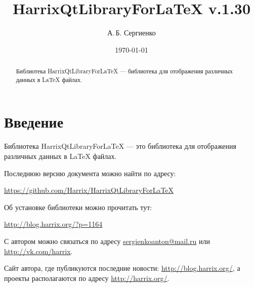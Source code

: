 \documentclass[a4paper,12pt]{article}
\title{HarrixQtLibraryForLaTeX v.1.30}
\author{А.\,Б. Сергиенко}
\date{\today}
\begin{document}


\maketitle

\begin{abstract}
Библиотека HarrixQtLibraryForLaTeX --- библиотека для отображения различных данных в LaTeX файлах.
\end{abstract}

\tableofcontents

\newpage

\section{Введение}

Библиотека HarrixQtLibraryForLaTeX --- это библиотека для отображения различных данных в LaTeX файлах.

Последнюю версию документа можно найти по адресу:

\href{https://github.com/Harrix/HarrixQtLibraryForLaTeX}{https://github.com/Harrix/HarrixQtLibraryForLaTeX}

Об установке библиотеки можно прочитать тут:

\href{http://blog.harrix.org/?p=1164}{http://blog.harrix.org/?p=1164}

С автором можно связаться по адресу \href{mailto:sergienkoanton@mail.ru}{sergienkoanton@mail.ru} или  \href{http://vk.com/harrix}{http://vk.com/harrix}.

Сайт автора, где публикуются последние новости: \href{http://blog.harrix.org/}{http://blog.harrix.org/}, а проекты располагаются по адресу \href{http://harrix.org/}{http://harrix.org/}.


\newpage
\end{document}
